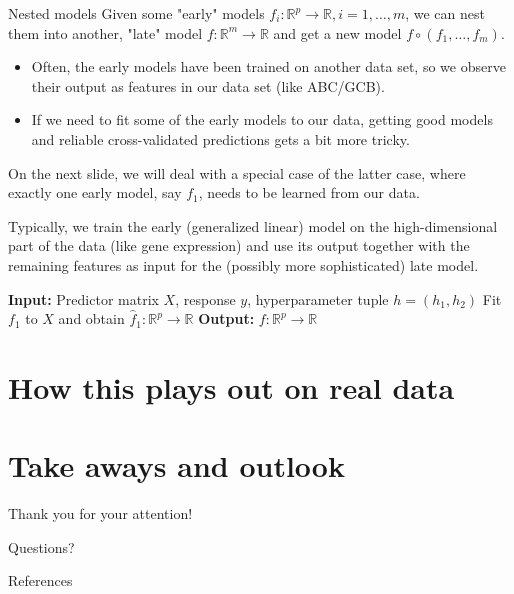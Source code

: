 \documentclass[10pt, aspectratio=169]{beamer}
\def\RR{\mathbb{R}}
\begin{document}
\begin{frame}{Nested models}
  Given some "early" models $f_i: \RR^p \to \RR, i = 1, \ldots, m$, we can nest 
  them into another, "late" model $f: \RR^m \to \RR$ and get a new model 
  $f \circ (f_1, \ldots, f_m)$.

  \begin{itemize}
    \item Often, the early models have been trained on another data set, so we 
      observe their output as features in our data set (like ABC/GCB).
    \item If we need to fit some of the early models to our data, getting good 
      models and reliable cross-validated predictions gets a bit more tricky. 
  \end{itemize}
  On the next slide, we will deal with a special case of the latter case, where 
  exactly one early model, say $f_1$, needs to be learned from our data.

  Typically, we train the early (generalized linear) model on the high-dimensional 
  part of the data (like gene expression) and use its output together with the 
  remaining features as input for the (possibly more sophisticated) late model.
\end{frame}

\begin{frame}{}
  \begin{algorithm}[H]
    \caption{Nested pseudo cross validation}
    \begin{algorithmic}[1]
      \State \textbf{Input:} Predictor matrix $X$, response $y$, hyperparameter tuple $h = (h_1, h_2)$
      \State Fit $f_1$ to $X$ and obtain $\hat{f}_1: \RR^p \to \RR$
      \State \textbf{Output:} $f: \RR^p \to \RR$
    \end{algorithmic}
  \end{algorithm}
\end{frame}

\section{How this plays out on real data}

\section{Take aways and outlook}

\begin{frame}[standout]
  Thank you for your attention! \par Questions?
\end{frame}

\appendix

\begin{frame}[allowframebreaks]{References}
  
\end{frame}
\end{document}
